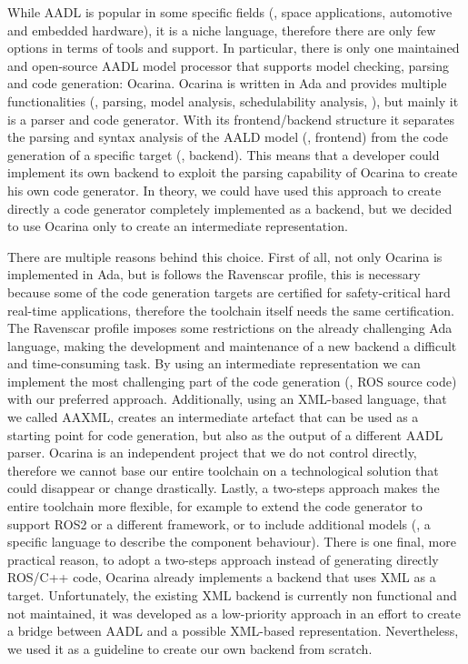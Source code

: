 While AADL is popular in some specific fields (\eg, space applications, automotive and embedded hardware), it is a niche language, therefore there are only few options in terms of tools and support. In particular, there is only one maintained and open-source AADL model processor that supports model checking, parsing and code generation: Ocarina. Ocarina is written in Ada and provides multiple functionalities (\eg, parsing, model analysis, schedulability analysis, \etc), but mainly it is a parser and code generator. With its frontend/backend structure it separates the parsing and syntax analysis of the AALD model (\ie, frontend) from the code generation of a specific target (\ie, backend). This means that a developer could implement its own backend to exploit the parsing capability of Ocarina to create his own code generator. In theory, we could have used this approach to create directly a code generator completely implemented as a backend, but we decided to use Ocarina only to create an intermediate representation.

There are multiple reasons behind this choice. First of all, not only Ocarina is implemented in Ada, but is follows the Ravenscar profile, this is necessary because some of the code generation targets are certified for safety-critical hard real-time applications, therefore the toolchain itself needs the same certification. The Ravenscar profile imposes some restrictions on the already challenging Ada language, making the development and maintenance of a new backend a difficult and time-consuming task. By using an intermediate representation we can implement the most challenging part of the code generation (\ie, ROS source code) with our preferred approach. Additionally, using an XML-based language, that we called AAXML, creates an intermediate artefact that can be used as a starting point for code generation, but also as the output of a different AADL parser. Ocarina is an independent project that we do not control directly, therefore we cannot base our entire toolchain on a technological solution that could disappear or change drastically. Lastly, a two-steps approach makes the entire toolchain more flexible, for example to extend the code generator to support ROS2 or a different framework, or to include additional models (\eg, a specific language to describe the component behaviour). There is one final, more practical reason, to adopt a two-steps approach instead of generating directly ROS/C++ code, Ocarina already implements a backend that uses XML as a target. Unfortunately, the existing XML backend is currently non functional and not maintained, it was developed as a low-priority approach in an effort to create a bridge between AADL and a possible XML-based representation. Nevertheless, we used it as a guideline to create our own backend from scratch.


